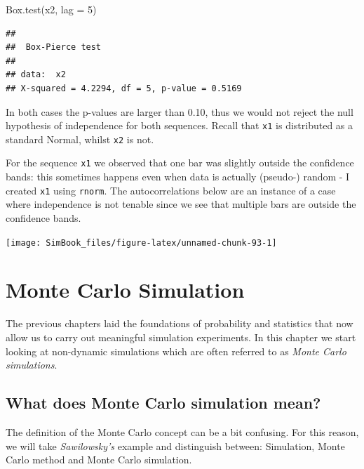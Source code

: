 \documentclass[
]{book}
\newenvironment{Shaded}{\begin{snugshade}}{\end{snugshade}}
\newcommand{\AttributeTok}[1]{\textcolor[rgb]{0.77,0.63,0.00}{#1}}
\newcommand{\DecValTok}[1]{\textcolor[rgb]{0.00,0.00,0.81}{#1}}
\newcommand{\FunctionTok}[1]{\textcolor[rgb]{0.00,0.00,0.00}{#1}}
\newcommand{\NormalTok}[1]{#1}
\begin{document}
\begin{Shaded}
\begin{Highlighting}[]
\FunctionTok{Box.test}\NormalTok{(x2, }\AttributeTok{lag =} \DecValTok{5}\NormalTok{)}
\end{Highlighting}
\end{Shaded}

\begin{verbatim}
## 
##  Box-Pierce test
## 
## data:  x2
## X-squared = 4.2294, df = 5, p-value = 0.5169
\end{verbatim}

In both cases the p-values are larger than 0.10, thus we would not reject the null hypothesis of independence for both sequences. Recall that \texttt{x1} is distributed as a standard Normal, whilst \texttt{x2} is not.

For the sequence \texttt{x1} we observed that one bar was slightly outside the confidence bands: this sometimes happens even when data is actually (pseudo-) random - I created \texttt{x1} using \texttt{rnorm}. The autocorrelations below are an instance of a case where independence is not tenable since we see that multiple bars are outside the confidence bands.

\begin{center}\texttt{[image: SimBook\_files/figure-latex/unnamed-chunk-93-1]} \end{center}

\hypertarget{monte-carlo-simulation}{%
\chapter{Monte Carlo Simulation}\label{monte-carlo-simulation}}

The previous chapters laid the foundations of probability and statistics that now allow us to carry out meaningful simulation experiments. In this chapter we start looking at non-dynamic simulations which are often referred to as \emph{Monte Carlo simulations}.

\hypertarget{what-does-monte-carlo-simulation-mean}{%
\section{What does Monte Carlo simulation mean?}\label{what-does-monte-carlo-simulation-mean}}

The definition of the Monte Carlo concept can be a bit confusing. For this reason, we will take \emph{Sawilowsky's} example and distinguish between: Simulation, Monte Carlo method and Monte Carlo simulation.
\end{document}
